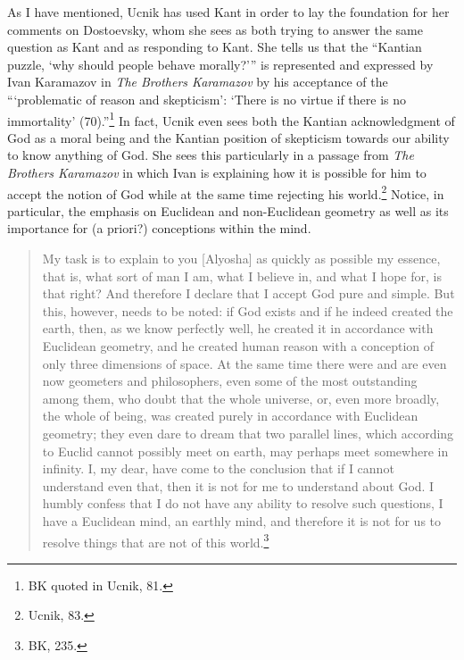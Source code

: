 \documentclass[12pt]{article}
\begin{document}
	As I have mentioned, Ucnik has used Kant in order to lay the foundation for her comments on Dostoevsky, whom she sees as both trying to answer the same question as Kant and as responding to Kant. She tells us that the ``Kantian puzzle, `why should people behave morally?'\thinspace'' is represented and expressed by Ivan Karamazov in \emph{The Brothers Karamazov} by his acceptance of the ``\thinspace`problematic of reason and skepticism': `There is no virtue if there is no immortality' (70).''\footnote{BK quoted in Ucnik, 81.} In fact, Ucnik even sees both the Kantian acknowledgment of God as a moral being and the Kantian position of skepticism towards our ability to know anything of God. She sees this particularly in a passage from \emph{The Brothers Karamazov} in which Ivan is explaining how it is possible for him to accept the notion of God while at the same time rejecting his world.\footnote{Ucnik, 83.} Notice, in particular, the emphasis on Euclidean and non-Euclidean geometry as well as its importance for (a priori?) conceptions within the mind. 
	
	\begin{quote}
	\singlespacing
	\footnotesize
	My task is to explain to you [Alyosha] as quickly as possible my essence, that is, what sort of man I am, what I believe in, and what I hope for, is that right? And therefore I declare that I accept God pure and simple. But this, however, needs to be noted: if God exists and if he indeed created the earth, then, as we know perfectly well, he created it in accordance with Euclidean geometry, and he created human reason with a conception of only three dimensions of space. At the same time there were and are even now geometers and philosophers, even some of the most outstanding among them, who doubt that the whole universe, or, even more broadly, the whole of being, was created purely in accordance with Euclidean geometry; they even dare to dream that two parallel lines, which according to Euclid cannot possibly meet on earth, may perhaps meet somewhere in infinity. I, my dear, have come to the conclusion that if I cannot understand even that, then it is not for me to understand about God. I humbly confess that I do not have any ability to resolve such questions, I have a Euclidean mind, an earthly mind, and therefore it is not for us to resolve things that are not of this world.\footnote{BK, 235.}
	\end{quote}
	
\end{document}
